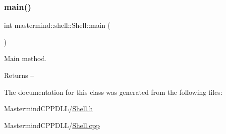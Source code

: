 \subsubsection{\texorpdfstring{main()}{main()}}
{\footnotesize\ttfamily int mastermind\+::shell\+::\+Shell\+::main (\begin{DoxyParamCaption}{ }\end{DoxyParamCaption})\hspace{0.3cm}{\ttfamily [static]}}



Main method. 

\begin{DoxyReturn}{Returns}
-- 
\end{DoxyReturn}


The documentation for this class was generated from the following files\+:\begin{DoxyCompactItemize}
\item 
Mastermind\+C\+P\+P\+D\+L\+L/\hyperlink{_shell_8h}{Shell.\+h}\item 
Mastermind\+C\+P\+P\+D\+L\+L/\hyperlink{_shell_8cpp}{Shell.\+cpp}\end{DoxyCompactItemize}
